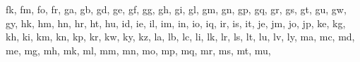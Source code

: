 \documentclass[letterpaper,10pt,english]{sphinxmanual}
\begin{document}
\begin{fulllineitems}
\begin{fulllineitems}
\textquotesingle{}fk\textquotesingle{}, \textquotesingle{}fm\textquotesingle{}, \textquotesingle{}fo\textquotesingle{}, \textquotesingle{}fr\textquotesingle{}, \textquotesingle{}ga\textquotesingle{}, \textquotesingle{}gb\textquotesingle{}, \textquotesingle{}gd\textquotesingle{}, \textquotesingle{}ge\textquotesingle{}, \textquotesingle{}gf\textquotesingle{}, \textquotesingle{}gg\textquotesingle{}, \textquotesingle{}gh\textquotesingle{}, \textquotesingle{}gi\textquotesingle{}, \textquotesingle{}gl\textquotesingle{}, \textquotesingle{}gm\textquotesingle{}, \textquotesingle{}gn\textquotesingle{}, \textquotesingle{}gp\textquotesingle{}, \textquotesingle{}gq\textquotesingle{}, \textquotesingle{}gr\textquotesingle{}, \textquotesingle{}gs\textquotesingle{}, \textquotesingle{}gt\textquotesingle{}, \textquotesingle{}gu\textquotesingle{}, \textquotesingle{}gw\textquotesingle{}, \textquotesingle{}gy\textquotesingle{}, \textquotesingle{}hk\textquotesingle{}, \textquotesingle{}hm\textquotesingle{}, \textquotesingle{}hn\textquotesingle{}, \textquotesingle{}hr\textquotesingle{}, \textquotesingle{}ht\textquotesingle{}, \textquotesingle{}hu\textquotesingle{}, \textquotesingle{}id\textquotesingle{}, \textquotesingle{}ie\textquotesingle{}, \textquotesingle{}il\textquotesingle{}, \textquotesingle{}im\textquotesingle{}, \textquotesingle{}in\textquotesingle{}, \textquotesingle{}io\textquotesingle{}, \textquotesingle{}iq\textquotesingle{}, \textquotesingle{}ir\textquotesingle{}, \textquotesingle{}is\textquotesingle{}, \textquotesingle{}it\textquotesingle{}, \textquotesingle{}je\textquotesingle{}, \textquotesingle{}jm\textquotesingle{}, \textquotesingle{}jo\textquotesingle{}, \textquotesingle{}jp\textquotesingle{}, \textquotesingle{}ke\textquotesingle{}, \textquotesingle{}kg\textquotesingle{}, \textquotesingle{}kh\textquotesingle{}, \textquotesingle{}ki\textquotesingle{}, \textquotesingle{}km\textquotesingle{}, \textquotesingle{}kn\textquotesingle{}, \textquotesingle{}kp\textquotesingle{}, \textquotesingle{}kr\textquotesingle{}, \textquotesingle{}kw\textquotesingle{}, \textquotesingle{}ky\textquotesingle{}, \textquotesingle{}kz\textquotesingle{}, \textquotesingle{}la\textquotesingle{}, \textquotesingle{}lb\textquotesingle{}, \textquotesingle{}lc\textquotesingle{}, \textquotesingle{}li\textquotesingle{}, \textquotesingle{}lk\textquotesingle{}, \textquotesingle{}lr\textquotesingle{}, \textquotesingle{}ls\textquotesingle{}, \textquotesingle{}lt\textquotesingle{}, \textquotesingle{}lu\textquotesingle{}, \textquotesingle{}lv\textquotesingle{}, \textquotesingle{}ly\textquotesingle{}, \textquotesingle{}ma\textquotesingle{}, \textquotesingle{}mc\textquotesingle{}, \textquotesingle{}md\textquotesingle{}, \textquotesingle{}me\textquotesingle{}, \textquotesingle{}mg\textquotesingle{}, \textquotesingle{}mh\textquotesingle{}, \textquotesingle{}mk\textquotesingle{}, \textquotesingle{}ml\textquotesingle{}, \textquotesingle{}mm\textquotesingle{}, \textquotesingle{}mn\textquotesingle{}, \textquotesingle{}mo\textquotesingle{}, \textquotesingle{}mp\textquotesingle{}, \textquotesingle{}mq\textquotesingle{}, \textquotesingle{}mr\textquotesingle{}, \textquotesingle{}ms\textquotesingle{}, \textquotesingle{}mt\textquotesingle{}, \textquotesingle{}mu\textquotesingle{}, 
\end{fulllineitems}
\end{fulllineitems}
\end{document}
